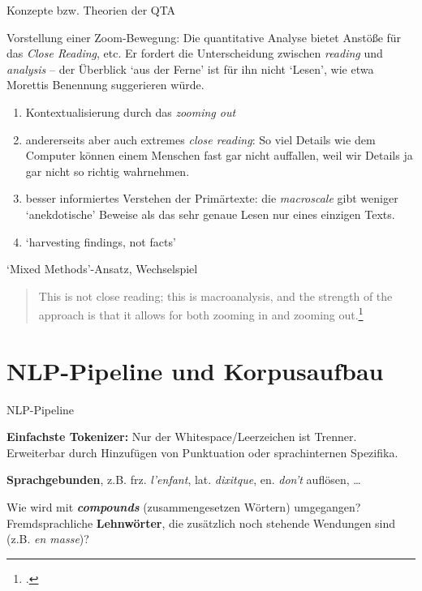 \documentclass[10pt,a4paper]{article}
\begin{document}
\begin{multicols}{3}
\begin{textbox}{Konzepte bzw. Theorien der QTA}
\bigskip

Vorstellung einer Zoom-Bewegung: Die quantitative Analyse bietet Anstöße für das \emph{Close Reading}, etc.
Er fordert die Unterscheidung zwischen \emph{reading} und \emph{analysis} -- der Überblick `aus der Ferne' ist für ihn nicht `Lesen', wie etwa Morettis Benennung suggerieren würde.
\begin{enumerate}
    \item Kontextualisierung durch das \emph{zooming out}
    \item andererseits aber auch extremes \emph{close reading}: So viel Details wie dem Computer können einem Menschen fast gar nicht auffallen, weil wir Details ja gar nicht so richtig wahrnehmen.
    \item besser informiertes Verstehen der Primärtexte: die \emph{macroscale} gibt weniger `anekdotische' Beweise als das sehr genaue Lesen nur eines einzigen Texts.
    \item `harvesting findings, not facts'
\end{enumerate}

`Mixed Methods'-Ansatz, Wechselspiel

\begin{quote}
    This is not close reading; this is macroanalysis, and the strength of the approach is that it allows for both zooming in and zooming out.\footcite[23]{macroanalysis}
\end{quote}


\end{textbox}


\section{NLP-Pipeline und Korpusaufbau}
\begin{textbox}{NLP-Pipeline}

\textbf{Einfachste Tokenizer:} Nur der Whitespace/Leerzeichen ist Trenner. Erweiterbar durch Hinzufügen von Punktuation oder sprachinternen Spezifika.

\textbf{Sprachgebunden}, z.B. frz. \emph{l'enfant}, lat. \emph{dixitque}, en. \emph{don't} auflösen, \dots 

Wie wird mit \textbf{\emph{compounds}} (zusammengesetzen Wörtern) umgegangen?
Fremdsprachliche \textbf{Lehnwörter}, die zusätzlich noch stehende Wendungen sind (z.B. \emph{en masse})?


\end{textbox}
\end{multicols}
\end{document}
